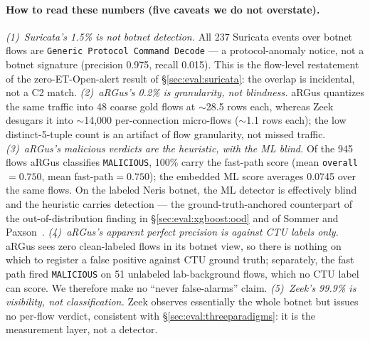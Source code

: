 \documentclass[11pt,a4paper]{article}
\begin{document}
    \paragraph{How to read these numbers (five caveats we do not overstate).}
    \emph{(1)~Suricata's 1.5\% is not botnet detection.} All 237 Suricata events over botnet
    flows are \texttt{Generic Protocol Command Decode} --- a protocol-anomaly notice, not a
    botnet signature (precision 0.975, recall 0.015). This is the flow-level restatement of the
    zero-ET-Open-alert result of \S\ref{sec:eval:suricata}: the overlap is incidental, not a C2
    match. \emph{(2)~aRGus's 0.2\% is granularity, not blindness.} aRGus quantizes the same
    traffic into 48 coarse gold flows at ${\sim}$28.5 rows each, whereas Zeek desugars it into
    ${\sim}$14{,}000 per-connection micro-flows (${\sim}$1.1 rows each); the low distinct-5-tuple
    count is an artifact of flow granularity, not missed traffic. \emph{(3)~aRGus's malicious
    verdicts are the heuristic, with the ML blind.} Of the 945 flows aRGus classifies
    \texttt{MALICIOUS}, 100\% carry the fast-path score (mean \texttt{overall}${=}0.750$, mean
    fast-path${=}0.750$); the embedded ML score averages 0.0745 over the same flows. On the
    labeled Neris botnet, the ML detector is effectively blind and the heuristic carries
    detection --- the ground-truth-anchored counterpart of the out-of-distribution finding in
    \S\ref{sec:eval:xgboost:ood} and of Sommer and Paxson~\cite{sommer2010}. \emph{(4)~aRGus's
    apparent perfect precision is against CTU labels only.} aRGus sees zero clean-labeled flows
    in its botnet view, so there is nothing on which to register a false positive against CTU
    ground truth; separately, the fast path fired \texttt{MALICIOUS} on 51 unlabeled
    lab-background flows, which no CTU label can score. We therefore make no ``never
    false-alarms'' claim. \emph{(5)~Zeek's 99.9\% is visibility, not classification.} Zeek
    observes essentially the whole botnet but issues no per-flow verdict, consistent with
    \S\ref{sec:eval:threeparadigms}: it is the measurement layer, not a detector.
\end{document}
